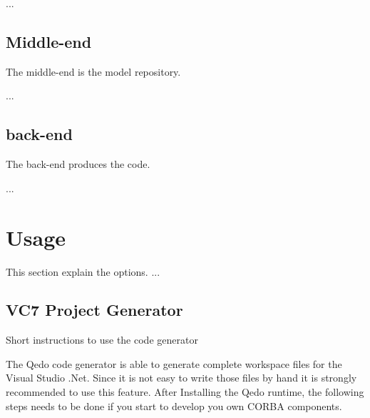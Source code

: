 \documentclass[12pt,a4paper]{report}
\begin{document}
 ... 

\section{Middle-end}
\label{sec:MiddleEnd}
The middle-end is the model repository. 

...

\section{back-end}
\label{sec:backEnd}
The back-end produces the code.

...

\chapter{Usage}
\label{sec:Usage}
This section explain the options. ...


\section{VC7 Project Generator}
\label{sec:VC7ProjectGenerator}

Short instructions to use the code generator

The Qedo code generator is able to generate complete workspace files for the Visual Studio .Net. Since it is not easy to write those files by hand it is strongly recommended to use this feature. After Installing the Qedo runtime, the following steps needs to be done if you start to develop you own CORBA components.
\end{document}
